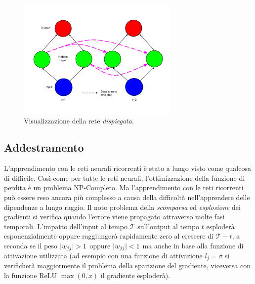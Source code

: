 \begin{figure}[tp]
  \centering
  \begin{center}
    \includegraphics[width=0.7\textwidth]{./images/unfoldedSimpleRecurrentNeuralNetwork.png}
  \end{center}
  \caption{Visualizzazione della rete \emph{dispiegata}.}
  \label{fig:unfoldedSimpleRecurrentNeuralNetwork}
\end{figure}


\subsection{Addestramento}
L'apprendimento con le reti neurali ricorrenti \`e stato a lungo visto come qualcosa di difficile.
Cos\`i come per tutte le reti neurali, l'ottimizzazione della funzione di perdita \`e un problema NP-Completo.
Ma l'apprendimento con le reti ricorrenti pu\`o essere reso ancora pi\`u complesso a causa della difficolt\`a nell'apprendere delle dipendenze a lungo raggio.
Il noto problema della \emph{scomparsa} ed \emph{esplosione} dei gradienti si verifica quando l'errore viene propagato attraverso molte fasi temporali.
 L'impatto dell'input al tempo $\mathcal{T}$ sull'output al tempo $t$ esploder\`a esponenzialmente oppure raggiunger\`a rapidamente zero al crescere di $\mathcal{T} - t$, a seconda se il peso $\lvert w_{jj}\rvert>1$ oppure $\lvert w_{jj}\rvert<1$ ma anche in base alla funzione di attivazione utilizzata
(ad esempio con una funzione di attivazione $l_j = \sigma$ si verificher\`a maggiormente il problema della sparizione del gradiente, viceversa con la funzione ReLU $\operatorname{max}(0, x)$ il gradiente esploder\`a).

